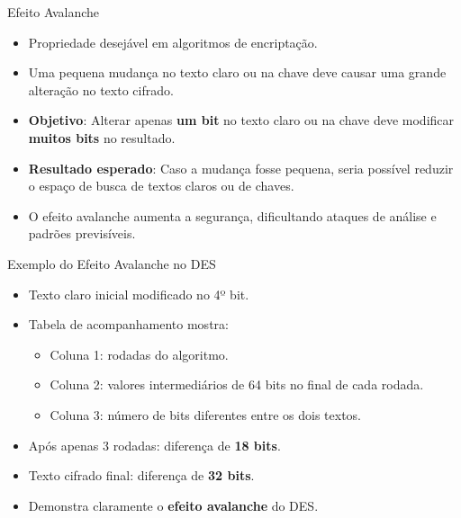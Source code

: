 \begin{frame}{Efeito Avalanche}
    \begin{itemize}
        \item Propriedade desejável em algoritmos de encriptação.
        \item Uma pequena mudança no texto claro ou na chave deve causar uma grande alteração no texto cifrado.
        \item \textbf{Objetivo}: Alterar apenas \textbf{um bit} no texto claro ou na chave deve modificar \textbf{muitos bits} no resultado.
        \item \textbf{Resultado esperado}: Caso a mudança fosse pequena, seria possível reduzir o espaço de busca de textos claros ou de chaves.
        \item O efeito avalanche aumenta a segurança, dificultando ataques de análise e padrões previsíveis.
    \end{itemize}
\end{frame}

\begin{frame}{Exemplo do Efeito Avalanche no DES}
    \begin{itemize}
        \item Texto claro inicial  modificado no 4º bit.
        \item Tabela de acompanhamento mostra:
        \begin{itemize}
            \item Coluna 1: rodadas do algoritmo.
            \item Coluna 2: valores intermediários de 64 bits no final de cada rodada.
            \item Coluna 3: número de bits diferentes entre os dois textos.
        \end{itemize}
        \item Após apenas 3 rodadas: diferença de \textbf{18 bits}.
        \item Texto cifrado final: diferença de \textbf{32 bits}.
        \item Demonstra claramente o \textbf{efeito avalanche} do DES.
    \end{itemize}


    
\end{frame}


